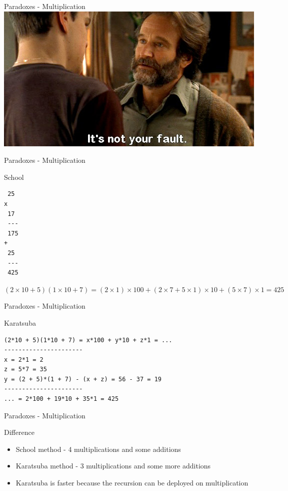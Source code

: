 \documentclass[presentation]{beamer}
\begin{document}
\begin{frame}[label=sec-2-14]{Paradoxes - Multiplication}
\includegraphics[width=.9\linewidth]{./img/gwh-not-your-fault.jpg}
\end{frame}
\begin{frame}[fragile,label=sec-2-15]{Paradoxes - Multiplication}
 \begin{block}{School}
\begin{verbatim}
 25 
x
 17 
 ---
 175 
+
 25 
 ---
 425
\end{verbatim}
$(2\times10 + 5)(1\times10 + 7) = (2\times1)\times100 + (2\times7 + 5\times1)\times10 + (5\times7)\times1 = 425$
\end{block}
\end{frame}
\begin{frame}[fragile,label=sec-2-16]{Paradoxes - Multiplication}
 \begin{block}{Karatsuba}
\begin{verbatim}
(2*10 + 5)(1*10 + 7) = x*100 + y*10 + z*1 = ...
----------------------
x = 2*1 = 2
z = 5*7 = 35
y = (2 + 5)*(1 + 7) - (x + z) = 56 - 37 = 19
----------------------
... = 2*100 + 19*10 + 35*1 = 425
\end{verbatim}
\end{block}
\end{frame}
\begin{frame}[label=sec-2-17]{Paradoxes - Multiplication}
\begin{block}{Difference}
\begin{itemize}
\item School method - 4 multiplications and some additions
\item Karatsuba method - 3 multiplications and some more additions
\item Karatsuba is faster because the recursion can be deployed on multiplication
\end{itemize}
\end{block}
\end{frame}
\end{document}
